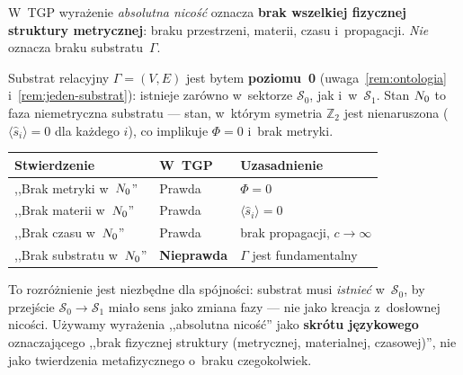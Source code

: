 \begin{remark}%
\label{rem:N0-substrat-precyzacja}
W~TGP wyra\.zenie \emph{absolutna nico\'s\'c} oznacza
\textbf{brak wszelkiej fizycznej struktury metrycznej}:
braku przestrzeni, materii, czasu i~propagacji.
\emph{Nie} oznacza braku substratu~$\Gamma$.

Substrat relacyjny $\Gamma = (V,E)$ jest bytem \textbf{poziomu~0}
(uwaga~\ref{rem:ontologia} i~\ref{rem:jeden-substrat}): istnieje
zar\'owno w~sektorze $\mathcal{S}_0$, jak i~w~$\mathcal{S}_1$.
Stan $N_0$ to faza niemetryczna substratu ---
stan, w~kt\'orym symetria $\mathbb{Z}_2$ jest nienaruszona
($\langle\hat{s}_i\rangle = 0$ dla ka\.zdego $i$),
co implikuje $\Phi = 0$ i~brak metryki.

\begin{center}
\small
\begin{tabular}{@{}p{4.5cm}p{2.6cm}p{4.5cm}@{}}
\toprule
\textbf{Stwierdzenie} & \textbf{W~TGP} & \textbf{Uzasadnienie} \\
\midrule
,,Brak metryki w~$N_0$'' & Prawda & $\Phi = 0$ \\
,,Brak materii w~$N_0$'' & Prawda & $\langle\hat{s}_i\rangle = 0$ \\
,,Brak czasu w~$N_0$'' & Prawda & brak propagacji, $c \to \infty$ \\
,,Brak substratu w~$N_0$'' & \textbf{Nieprawda} & $\Gamma$ jest fundamentalny \\
\bottomrule
\end{tabular}
\end{center}

To rozr\'o\.znienie jest niezb\k{e}dne dla sp\'ojno\'sci:
substrat musi \emph{istnie\'c} w~$\mathcal{S}_0$, by przej\'scie
$\mathcal{S}_0 \to \mathcal{S}_1$ mia\l{}o sens jako zmiana fazy ---
nie jako kreacja z~dosłownej nico\'sci.
U\.zywamy wyra\.zenia ,,absolutna nico\'s\'c''
jako \textbf{skr\'otu j\k{e}zykowego} oznaczaj\k{a}cego
,,brak fizycznej struktury (metrycznej, materialnej, czasowej)'',
nie jako twierdzenia metafizycznego o~braku czegokolwiek.
\end{remark}

